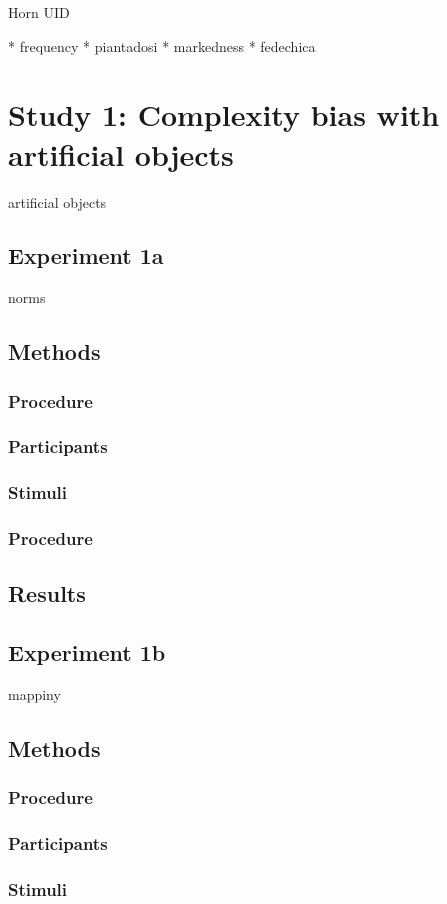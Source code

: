 \documentclass[man]{apa2}
\begin{document}
Horn
UID

* frequency
* piantadosi
* markedness
* fedechica



\section{Study 1: Complexity bias with artificial objects} 
 artificial objects
\subsection{\textbf{Experiment 1a}}
norms
\subsection{Methods}
\subsubsection{Procedure}
\subsubsection{Participants}
\subsubsection{Stimuli}
\subsubsection{Procedure}

\subsection{Results}
\subsection{\textbf{Experiment 1b}}
mappiny

\subsection{Methods}
\subsubsection{Procedure}
\subsubsection{Participants}
\subsubsection{Stimuli}
\end{document}
